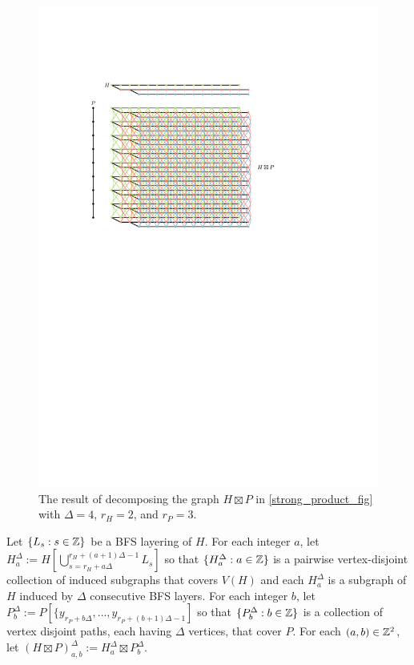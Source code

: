 \documentclass{patmorin}
\begin{document}
\begin{figure}
  \centering
  \includegraphics[page=2]{figs/product}
  \caption{The result of decomposing the graph $H\boxtimes P$ in \cref{strong_product_fig} with $\Delta=4$, $r_H=2$, and $r_P=3$.}
  \label{chop_fig}
\end{figure}

Let $\{L_s:s\in\mathbb{Z}\}$ be a BFS layering of $H$.  For each integer $a$, let $H^\Delta_a:=H[\bigcup_{s=r_H+a\Delta}^{r_H+(a+1)\Delta-1} L_s]$ so that $\{H^\Delta_a:a\in \mathbb{Z}\}$ is a pairwise vertex-disjoint collection of induced subgraphs that covers $V(H)$ and each $H^\Delta_a$ is a subgraph of $H$ induced by $\Delta$ consecutive BFS layers. For each integer $b$, let $P^\Delta_b:=P[\{y_{r_P+b\Delta},\ldots,y_{r_P+(b+1)\Delta-1}]$ so that $\{P^\Delta_b:b\in\mathbb{Z}\}$ is a collection of vertex disjoint paths, each having $\Delta$ vertices, that cover $P$.   For each $(a,b)\in\mathbb{Z}^2$, let $(H\boxtimes P)^\Delta_{a,b}:= H^\Delta_a \boxtimes P^\Delta_b$.
\end{document}
